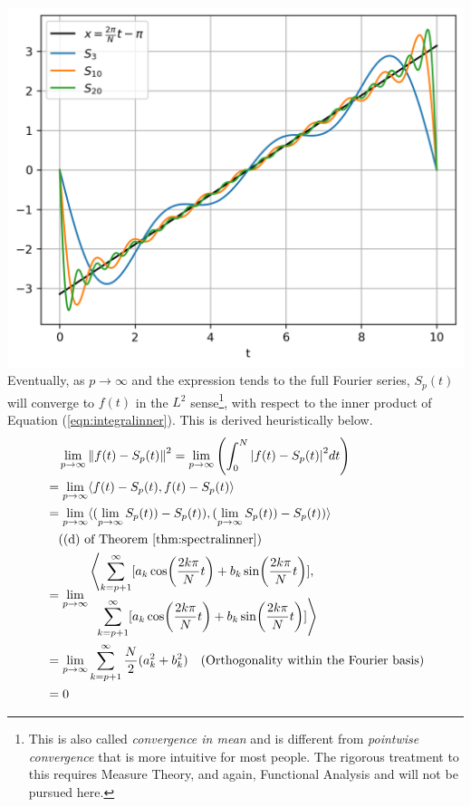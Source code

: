\includegraphics[scale=0.55]{graphics/fourierxapprox.png}\\
Eventually, as $p \to \infty$ and the expression tends to the full Fourier series, $S_p(t)$ will converge to $f(t)$ in the $L^2$ sense\footnote{This is also called \textit{convergence in mean} and is different from \textit{pointwise convergence} that is more intuitive for most people. The rigorous treatment to this requires Measure Theory, and again, Functional Analysis and will not be pursued here.}, with respect to the inner product of Equation (\ref{eqn:integralinner}). This is derived heuristically below.
\begin{align*}
&\quad \lim_{p \to \infty} \norm{f(t) - S_p(t)}^2 = \lim_{p \to \infty} \left(\int_{0}^{N} \abs{f(t) - S_p(t)}^2 dt\right) \\ 
&= \lim_{p \to \infty} \langle f(t) - S_p(t), f(t) - S_p(t) \rangle \\
&= \lim_{p \to \infty} \langle (\lim_{p \to \infty} S_p(t)) - S_p(t)), (\lim_{p \to \infty} S_p(t)) - S_p(t)) \rangle \\
& \quad \text{((d) of Theorem \ref{thm:spectralinner})}\\
&= \lim_{p \to \infty} \begin{aligned}
\left\langle \sum_{k=p+1}^{\infty} [a_k \cos(\frac{2k\pi}{N}t) + b_k \sin(\frac{2k\pi}{N}t)], \right. \\
\left. \sum_{k=p+1}^{\infty} [a_k \cos(\frac{2k\pi}{N}t) + b_k \sin(\frac{2k\pi}{N}t)] \right\rangle \end{aligned} \\
&= \lim_{p \to \infty} \sum_{k=p+1}^{\infty} \frac{N}{2} (a_k^2 + b_k^2) \quad 
\text{(Orthogonality within the Fourier basis)} \\
&= 0
\end{align*}
